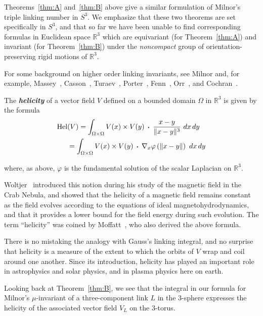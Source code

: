 \documentclass[11pt]{amsart}
\theoremstyle{definition}
\newcommand{\thmref}[1]{Theorem~\ref{#1}}
\newcommand{\itb}{\bfseries\itshape}
\def\br{\mathbb R}
\def\dt{\,\raisebox{.2ex}{\text{\tiny\textbullet}}\,}
\def\dtw{\,\dt\,}
\begin{document}
Theorems~\ref{thm:A} and~\ref{thm:B} above give a similar formulation of Milnor's triple linking number in $S^3$.  We emphasize that these two theorems are set specifically in $S^3$, and that so far we have been unable to find corresponding formulas in Euclidean space $\br^3$ which are equivariant (for \thmref{thm:A}) and invariant (for \thmref{thm:B}) under the {\sl noncompact} group of orientation-preserving rigid motions of $\br^3$.  

For some background on higher order linking invariants, see Milnor \cite{Milnor57} and, for example, Massey~\cite{Massey68}, Casson~\cite{Casson75}, Turaev~\cite{Turaev76}, Porter~\cite{Porter}, Fenn~\cite{Fenn83}, Orr~\cite{Orr}, and Cochran~\cite{Cochran}.


The {\itb helicity} of a vector field $V$ defined on a bounded domain $\Omega$ in $\br^3$ is given by the formula
\[
	\begin{aligned}
	\text{Hel}&(V) = \int_{\Omega \times \Omega} V(x) \times V(y) \dtw \frac{x-y}{\|x-y\|^3} \  dx \, dy \\
	&= \int_{\Omega \times \Omega} V(x) \times V(y) \dtw \nabla_x \varphi\left(\|x-y\|\right) \ dx \, dy
	\end{aligned}
\]

\noindent where, as above, $\varphi$ is the fundamental solution of the scalar Laplacian on $\br^3$.  

Woltjer~\cite{Woltjer} introduced this notion during his study of the magnetic field in the Crab Nebula, and showed that the helicity of a magnetic field remains constant as the field evolves according to the equations of ideal magnetohydrodynamics, and that it provides a lower bound for the field energy during such evolution.  The term ``helicity'' was coined by Moffatt~\cite{Moffatt}, who also derived the above formula.  

There is no mistaking the analogy with Gauss's linking integral, and no surprise that helicity is a measure of the extent to which the orbits of $V$ wrap and coil around one another.  Since its introduction, helicity has played an important role in astrophysics and solar physics, and in plasma physics here on earth.

Looking back at \thmref{thm:B}, we see that the integral in our formula for Milnor's $\mu$-invariant of a three-component link $L$ in the 3-sphere expresses the helicity of the associated vector field $V_L$ on the 3-torus.
\end{document}
